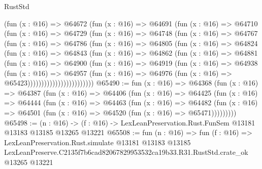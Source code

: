\begin{lexlean}{RustStd}
\begin{coremodule}
                (fun (x : @16) =>
                @64672
                  (fun (x : @16) =>
                  @64691
                    (fun (x : @16) =>
                    @64710
                      (fun (x : @16) =>
                      @64729
                        (fun (x : @16) =>
                        @64748
                          (fun (x : @16) =>
                          @64767
                            (fun (x : @16) =>
                            @64786
                              (fun (x : @16) =>
                              @64805
                                (fun (x : @16) =>
                                @64824
                                  (fun (x : @16) =>
                                  @64843
                                    (fun (x : @16) =>
                                    @64862
                                      (fun (x : @16) =>
                                      @64881
                                        (fun (x : @16) =>
                                        @64900
                                          (fun (x : @16) =>
                                          @64919
                                            (fun (x : @16) =>
                                            @64938
                                              (fun (x : @16) =>
                                              @64957
                                                (fun (x : @16) =>
                                                @64976
                                                  (fun (x : @16) => @65423))))))))))))))))))))))))
@65490 := fun (x : @16) =>
  @64368
    (fun (x : @16) =>
    @64387
      (fun (x : @16) =>
      @64406
        (fun (x : @16) =>
        @64425
          (fun (x : @16) =>
          @64444
            (fun (x : @16) =>
            @64463
              (fun (x : @16) =>
              @64482
                (fun (x : @16) => @64501 (fun (x : @16) => @64520 (fun (x : @16) => @65471)))))))))
@65498 := (n : @16) ->
  (f : @16) -> LexLeanPreservation.Rust.FunSem @13181 @13183 @13185 @13265 @13221
@65508 := fun (n : @16) =>
  fun (f : @16) =>
  LexLeanPreservation.Rust.simulate
    @13181
    @13183
    @13185
    LexLeanPreserve.C2135f7b6cad82067829953532ca19b33.R31.RustStd.crate_ok
    @13265
    @13221
\end{coremodule}
\end{lexlean}
